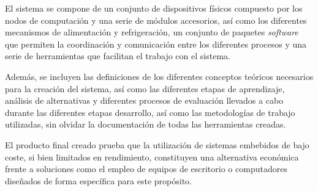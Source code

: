 El sistema se compone de un conjunto de dispositivos físicos compuesto por los nodos de computación y una serie de módulos accesorios, así como los diferentes mecanismos de alimentación y refrigeración, un conjunto de paquetes \textit{software} que permiten la coordinación y comunicación entre los diferentes procesos y una serie de herramientas que facilitan el trabajo con el sistema.

Además, se incluyen las definiciones de los diferentes conceptos teóricos necesarios para la creación del sistema, así como las diferentes etapas de aprendizaje, análisis de alternativas y diferentes procesos de evaluación llevados a cabo durante las diferentes etapas desarrollo, así como las metodologías de trabajo utilizadas, sin olvidar la documentación de todas las herramientas creadas.

El producto final creado prueba que la utilización de sistemas embebidos de bajo coste, si bien limitados en rendimiento, constituyen una alternativa económica frente a soluciones como el empleo de equipos de escritorio o computadores diseñados de forma específica para este propósito.
